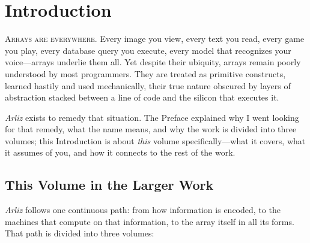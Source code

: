 \chapter*{Introduction}

\lettrine{A}{rrays are everywhere}. Every image you view, every text you read, every game you play, every database query you execute, every model that recognizes your voice---arrays underlie them all. Yet despite their ubiquity, arrays remain poorly understood by most programmers. They are treated as primitive constructs, learned hastily and used mechanically, their true nature obscured by layers of abstraction stacked between a line of code and the silicon that executes it.

\textit{Arliz} exists to remedy that situation. The Preface explained why I went looking for that remedy, what the name means, and why the work is divided into three volumes; this Introduction is about \emph{this} volume specifically---what it covers, what it assumes of you, and how it connects to the rest of the work.

\section*{This Volume in the Larger Work}


\textit{Arliz} follows one continuous path: from how information is encoded, to the machines that compute on that information, to the array itself in all its forms. That path is divided into three volumes:

